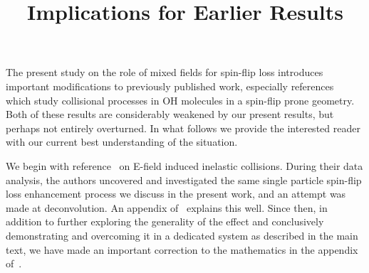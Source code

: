 \documentclass[%
 reprint,
 amsmath,amssymb,
 aps,
prl,
]{revtex4-1}
\begin{document}

\title{Implications for Earlier Results}%







\maketitle



The present study on the role of mixed fields for spin-flip loss introduces important modifications to previously published work, especially references~\cite{Stuhl2012evap,Stuhl2013} which study collisional processes in OH molecules in a spin-flip prone geometry. 
Both of these results are considerably weakened by our present results, but perhaps not entirely overturned. 
In what follows we provide the interested reader with our current best understanding of the situation.

We begin with reference~\cite{Stuhl2013} on E-field induced inelastic collisions. 
During their data analysis, the authors uncovered and investigated the same single particle spin-flip loss enhancement process we discuss in the present work, and an attempt was made at deconvolution. 
An appendix of~\cite{Stuhl2013} explains this well. 
Since then, in addition to further exploring the generality of the effect and conclusively demonstrating and overcoming it in a dedicated system as described in the main text, we have made an important correction to the mathematics in the appendix of~\cite{Stuhl2013}.
\end{document}
